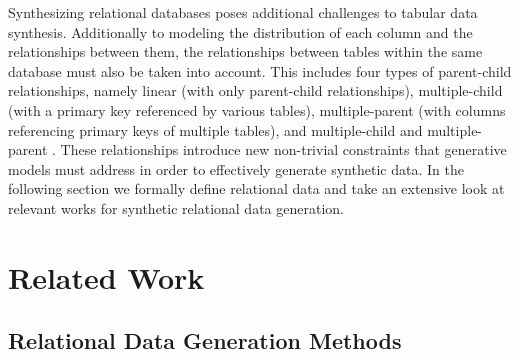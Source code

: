 \documentclass[fleqn,moreauthors,10pt]{ds_report}
\begin{document}
Synthesizing relational databases poses additional challenges to tabular data synthesis. Additionally to modeling the distribution of each column and the relationships between them, the relationships between tables within the same database must also be taken into account. This includes four types of parent-child relationships, namely linear (with only parent-child relationships), multiple-child (with a primary key referenced by various tables), multiple-parent (with columns referencing primary keys of multiple tables), and multiple-child and multiple-parent . These relationships introduce new non-trivial constraints that generative models must address in order to effectively generate synthetic data.
In the following section we formally define relational data and take an extensive look at relevant works for synthetic relational data generation.


\section*{Related Work}
\subsection*{Relational Data Generation Methods}
\end{document}
